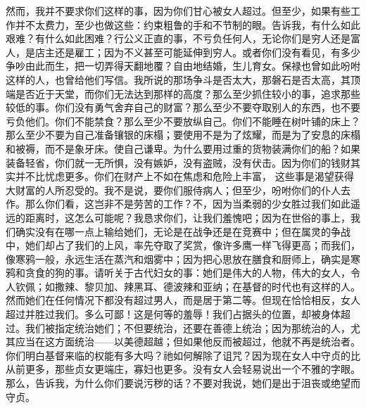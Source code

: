 然而，我并不要求你们这样的事，因为你们甘心被女人超过。但至少，如果有些工作并不太费力，至少也做这些：约束粗鲁的手和不节制的眼。告诉我，有什么如此艰难？有什么如此困难？行公义正直的事，不亏负任何人，无论你们是穷人还是富人，是店主还是雇工；因为不义甚至可能延伸到穷人。或者你们没有看见，有多少争吵由此而生，把一切弄得天翻地覆？自由地结婚，生儿育女。保禄也曾如此吩咐这样的人，也曾给他们写信。我所说的那场争斗是否太大，那磐石是否太高，其顶端是否近于天堂，而你们无法达到那样的高度？那么至少抓住较小的事，追求那些较低的事。你们没有勇气舍弃自己的财富？那么至少不要夺取别人的东西，也不要亏负他们。你们不能禁食？那么至少不要放纵自己。你们不能睡在树叶铺的床上？那么至少不要为自己准备镶银的床榻；要使用不是为了炫耀，而是为了安息的床榻和被褥，而不是象牙床。使自己谦卑。为什么要用过重的货物装满你们的船？如果装备轻省，你们就一无所惧，没有嫉妒，没有盗贼，没有伏击。因为你们的钱财其实并不比忧虑更多。你们在财产上不如在焦虑和危险上丰富， 这些事是渴望获得大财富的人所忍受的。我不是说，要你们服侍病人；但至少，吩咐你们的仆人去作。那么你们看，这岂非不是劳苦的工作？不，因为当柔弱的少女胜过我们如此遥远的距离时，这怎么可能呢？我恳求你们，让我们羞愧吧；因为在世俗的事上，我们确实没有在哪一点上输给她们，无论是在战争还是在竞赛中；但在属灵的争战中，她们却占了我们的上风，率先夺取了奖赏，像许多鹰一样飞得更高；而我们，像寒鸦一般，永远生活在蒸汽和烟雾中；因为把心思放在膳食和厨师上，确实是寒鸦和贪食的狗的事。请听关于古代妇女的事：她们是伟大的人物，伟大的女人，令人钦佩；如撒辣、黎贝加、辣黑耳、德波辣和亚纳；在基督的时代也有这样的人。然而她们在任何情况下都没有超过男人，而是居于第二等。但现在恰恰相反，女人超过并胜过我们。多么可鄙！这是何等的羞辱！我们占据头的位置，却被身体超过。我们被指定统治她们；不但要统治，还要在善德上统治；因为那统治的人，尤其应当在这方面统治——以美德超越；但如果他反而被超过，他就不再是统治者。你们明白基督来临的权能有多大吗？祂如何解除了诅咒？因为现在女人中守贞的比从前更多，那些贞女更端庄，寡妇也更多。没有女人会轻易说出一个不雅的字眼。那么，告诉我，为什么你们要说污秽的话？不要对我说，她们是出于沮丧或绝望而守贞。\par

